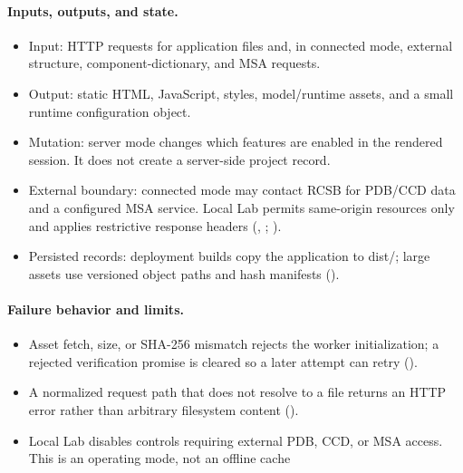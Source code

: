 \documentclass[11pt]{article}
\begin{document}
\begin{small}
\paragraph{Inputs, outputs, and state.}

\begin{itemize}[leftmargin=*]

\item Input: HTTP requests for application files and, in connected mode, external structure, component-dictionary, and MSA requests.

\item Output: static HTML, JavaScript, styles, model/runtime assets, and a small runtime configuration object.

\item Mutation: server mode changes which features are enabled in the rendered session. It does not create a server-side project record.

\item External boundary: connected mode may contact RCSB for PDB/CCD data and a configured MSA service. Local Lab permits same-origin resources only and applies restrictive response headers (, ; ).

\item Persisted records: deployment builds copy the application to dist/; large assets use versioned object paths and hash manifests ().

\end{itemize}

\paragraph{Failure behavior and limits.}

\begin{itemize}[leftmargin=*]

\item Asset fetch, size, or SHA-256 mismatch rejects the worker initialization; a rejected verification promise is cleared so a later attempt can retry ().

\item A normalized request path that does not resolve to a file returns an HTTP error rather than arbitrary filesystem content ().

\item Local Lab disables controls requiring external PDB, CCD, or MSA access. This is an operating mode, not an offline cache


\end{itemize}
\end{small}
\end{document}
